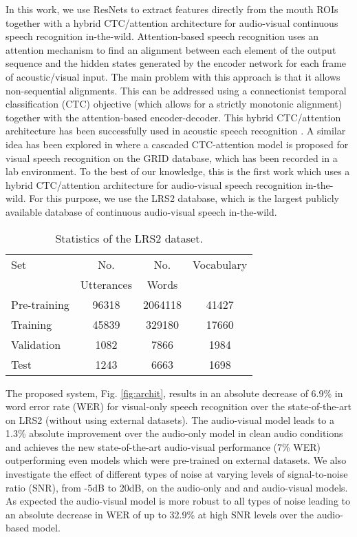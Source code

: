 \documentclass{article}
\begin{document}
In this work, we use ResNets to extract features directly from the mouth ROIs together with a hybrid CTC/attention architecture \cite{watanabe2017hybrid} for audio-visual continuous speech recognition in-the-wild.  Attention-based  speech recognition  uses  an  attention  mechanism  to  find  an  alignment between each element of the output sequence and the hidden states  generated  by  the    encoder  network  for  each frame  of  acoustic/visual  input. The main problem with this approach is that it allows non-sequential alignments. This can be addressed using a connectionist temporal classification (CTC) objective (which allows for a strictly monotonic alignment) together with the attention-based encoder-decoder. This hybrid CTC/attention architecture has been successfully used in acoustic speech recognition \cite{watanabe2017hybrid}. A similar idea has been explored in \cite{LCAnet} where a cascaded CTC-attention model is proposed for visual speech recognition on the GRID database, which has been recorded in a lab environment. To the best of our knowledge, this is the first work which uses a hybrid CTC/attention architecture for audio-visual speech recognition in-the-wild. For this purpose, we use the LRS2 database, which is the largest publicly available database of continuous audio-visual speech in-the-wild.

\begin{table}[t]
\renewcommand{\arraystretch}{1.1}
\renewcommand{\tabcolsep}{7pt}
\caption{ Statistics of the LRS2 dataset.   }
\label{tab:LRS2stats}
\centering
\begin{tabular}{lccc}
\toprule  Set & No. & No.& Vocabulary   \\
& Utterances  & Words & \\

\midrule Pre-training  &  96318	&2064118	&41427 \\
Training  & 45839	&329180	&17660\\
Validation  & 1082	&7866	&1984\\
Test  & 1243 &	6663	&1698  \\

\bottomrule

\end{tabular} 

\end{table}

The proposed system, Fig. \ref{fig:archit}, results in an absolute decrease of 6.9\% in 
word error rate (WER) for visual-only speech recognition over the state-of-the-art on LRS2 (without using external datasets). The audio-visual model leads to a 1.3\% absolute improvement over the audio-only model in clean audio conditions and achieves the new state-of-the-art audio-visual performance (7\% WER) outperforming even models which were pre-trained on external datasets. We also investigate the effect of different types of noise at varying levels of signal-to-noise ratio (SNR), from -5dB to 20dB, on the audio-only and and audio-visual models. As expected the audio-visual model is more robust to all types of noise leading to an absolute decrease in WER of up to 32.9\% at high SNR levels over the audio-based model.
\end{document}
